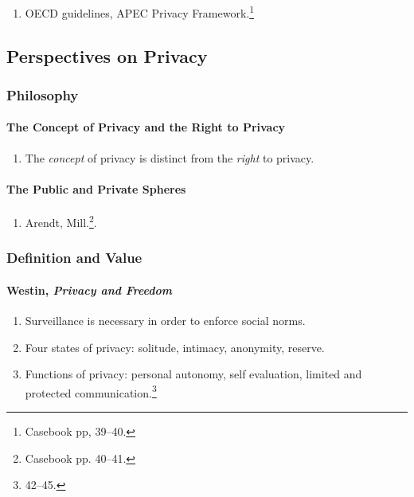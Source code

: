 \begin{enumerate}
    \item OECD guidelines, APEC Privacy Framework.\footnote{Casebook pp, 
    39--40.}
\end{enumerate}

\subsection{Perspectives on Privacy}

\subsubsection{Philosophy}

\paragraph{The Concept of Privacy and the Right to Privacy}

\begin{enumerate}
    \item The \emph{concept} of privacy is distinct from the \emph{right} to 
    privacy.
\end{enumerate}

\paragraph{The Public and Private Spheres}

\begin{enumerate}
    \item Arendt, Mill.\footnote{Casebook pp. 40--41.}.
\end{enumerate}

\subsubsection{Definition and Value}

\paragraph{Westin, \emph{Privacy and Freedom}}

\begin{enumerate}
    \item Surveillance is necessary in order to enforce social norms.
    \item Four states of privacy: solitude, intimacy, anonymity, reserve.
    \item Functions of privacy: personal autonomy, self evaluation, limited 
    and protected communication.\footnote{42--45.}
\end{enumerate}

